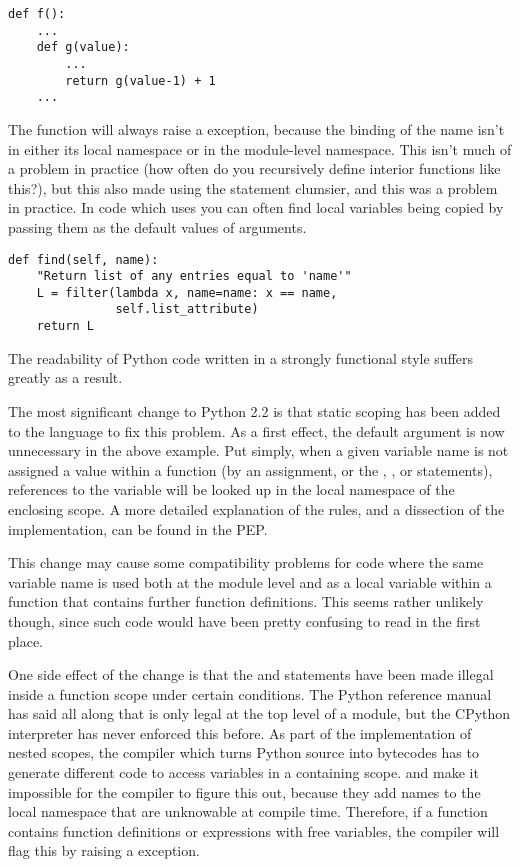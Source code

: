 \documentclass{howto}
\begin{document}
\begin{verbatim}
def f():
    ...
    def g(value):
        ...
        return g(value-1) + 1
    ...
\end{verbatim}

The function  will always raise a 
exception, because the binding of the name  isn't in either
its local namespace or in the module-level namespace.  This isn't much
of a problem in practice (how often do you recursively define interior
functions like this?), but this also made using the 
statement clumsier, and this was a problem in practice.  In code which
uses  you can often find local variables being copied
by passing them as the default values of arguments.

\begin{verbatim}
def find(self, name):
    "Return list of any entries equal to 'name'"
    L = filter(lambda x, name=name: x == name,
               self.list_attribute)
    return L
\end{verbatim}

The readability of Python code written in a strongly functional style
suffers greatly as a result.

The most significant change to Python 2.2 is that static scoping has
been added to the language to fix this problem.  As a first effect,
the  default argument is now unnecessary in the above
example.  Put simply, when a given variable name is not assigned a
value within a function (by an assignment, or the ,
, or  statements), references to the
variable will be looked up in the local namespace of the enclosing
scope.  A more detailed explanation of the rules, and a dissection of
the implementation, can be found in the PEP.

This change may cause some compatibility problems for code where the
same variable name is used both at the module level and as a local
variable within a function that contains further function definitions.
This seems rather unlikely though, since such code would have been
pretty confusing to read in the first place.  

One side effect of the change is that the  and  statements have been made illegal inside
a function scope under certain conditions.  The Python reference
manual has said all along that  is
only legal at the top level of a module, but the CPython interpreter
has never enforced this before.  As part of the implementation of
nested scopes, the compiler which turns Python source into bytecodes
has to generate different code to access variables in a containing
scope.   and  make it
impossible for the compiler to figure this out, because they add names
to the local namespace that are unknowable at compile time.
Therefore, if a function contains function definitions or
 expressions with free variables, the compiler will
flag this by raising a  exception.
\end{document}
